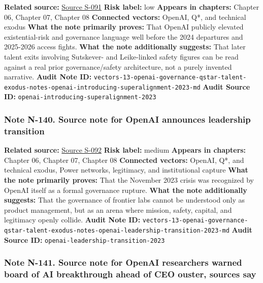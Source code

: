 \documentclass[
  american,
  11pt,
  letterpaper,
]{article}
\begin{document}
\textbf{Related source:}
\hyperref[source-s-091-introducing-superalignment]{Source S-091}
\textbf{Risk label:} low \textbf{Appears in chapters:} Chapter 06,
Chapter 07, Chapter 08 \textbf{Connected vectors:} OpenAI, Q*, and
technical exodus \textbf{What the note primarily proves:} That OpenAI
publicly elevated existential-risk and governance language well before
the 2024 departures and 2025-2026 access fights. \textbf{What the note
additionally suggests:} That later talent exits involving Sutskever- and
Leike-linked safety figures can be read against a real prior
governance/safety architecture, not a purely invented narrative.
\textbf{Audit Note ID:}
\texttt{vectors-13-openai-governance-qstar-talent-exodus-notes-openai-introducing-superalignment-2023-md}
\textbf{Audit Source ID:}
\texttt{openai-introducing-superalignment-2023}

\subsubsection{Note N-140. Source note for OpenAI announces leadership
transition}\label{note-n-140-vectors-13-openai-governance-qstar-talent-exodus-notes-openai-leadership-transition-2023-md}

\textbf{Related source:}
\hyperref[source-s-092-openai-announces-leadership-transition]{Source
S-092} \textbf{Risk label:} medium \textbf{Appears in chapters:} Chapter
06, Chapter 07, Chapter 08 \textbf{Connected vectors:} OpenAI, Q*, and
technical exodus, Power networks, legitimacy, and institutional capture
\textbf{What the note primarily proves:} That the November 2023 crisis
was recognized by OpenAI itself as a formal governance rupture.
\textbf{What the note additionally suggests:} That the governance of
frontier labs cannot be understood only as product management, but as an
arena where mission, safety, capital, and legitimacy openly collide.
\textbf{Audit Note ID:}
\texttt{vectors-13-openai-governance-qstar-talent-exodus-notes-openai-leadership-transition-2023-md}
\textbf{Audit Source ID:} \texttt{openai-leadership-transition-2023}

\subsubsection{Note N-141. Source note for OpenAI researchers warned
board of AI breakthrough ahead of CEO ouster, sources
say}\label{note-n-141-vectors-13-openai-governance-qstar-talent-exodus-notes-reuters-qstar-board-warning-2023-md}
\end{document}
